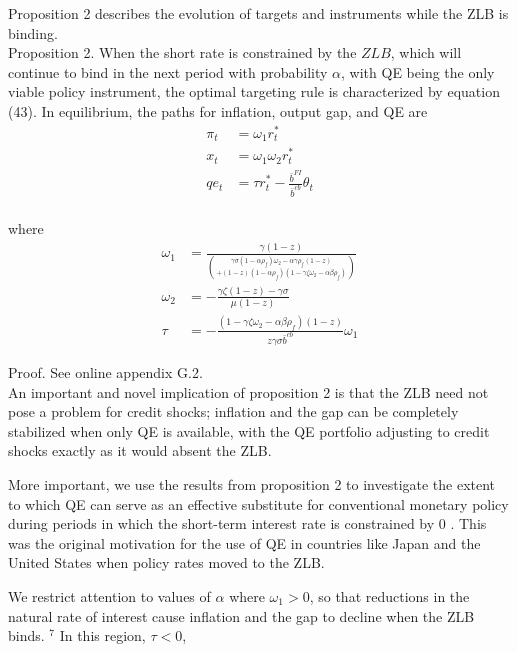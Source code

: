 \documentclass[10pt]{article}
\begin{document}
Proposition 2 describes the evolution of targets and instruments while the ZLB is binding.\\
Proposition 2. When the short rate is constrained by the $Z L B$, which will continue to bind in the next period with probability $\alpha$, with QE being the only viable policy instrument, the optimal targeting rule is characterized by equation (43). In equilibrium, the paths for inflation, output gap, and QE are\\
\begin{align*}
\pi_{t} & =\omega_{1} r_{t}^{*}  \tag{44}\\
x_{t} & =\omega_{1} \omega_{2} r_{t}^{*}  \tag{45}\\
q e_{t} & =\tau r_{t}^{*}-\frac{\bar{b}^{F I}}{\bar{b}^{c b}} \theta_{t} \tag{46}
\end{align*}\\
where\\
\begin{align*}
\omega_{1} & =\frac{\gamma(1-z)}{\binom{\gamma \sigma\left(1-\alpha \rho_{f}\right) \omega_{2}-\alpha \gamma \rho_{f}(1-z)}{+(1-z)\left(1-\alpha \rho_{f}\right)\left(1-\gamma \zeta \omega_{2}-\alpha \beta \rho_{f}\right)}}  \tag{47}\\
\omega_{2} & =-\frac{\gamma \zeta(1-z)-\gamma \sigma}{\mu(1-z)}  \tag{48}\\
\tau & =-\frac{\left(1-\gamma \zeta \omega_{2}-\alpha \beta \rho_{f}\right)(1-z)}{z \gamma \sigma \bar{b}^{c b}} \omega_{1} \tag{49}
\end{align*}

Proof. See online appendix G.2.\\
An important and novel implication of proposition 2 is that the ZLB need not pose a problem for credit shocks; inflation and the gap can be completely stabilized when only QE is available, with the QE portfolio adjusting to credit shocks exactly as it would absent the ZLB.

More important, we use the results from proposition 2 to investigate the extent to which QE can serve as an effective substitute for conventional monetary policy during periods in which the short-term interest rate is constrained by 0 . This was the original motivation for the use of QE in countries like Japan and the United States when policy rates moved to the ZLB.

We restrict attention to values of $\alpha$ where $\omega_{1}>0$, so that reductions in the natural rate of interest cause inflation and the gap to decline when the ZLB binds. ${ }^{7}$ In this region, $\tau<0$,
\end{document}
